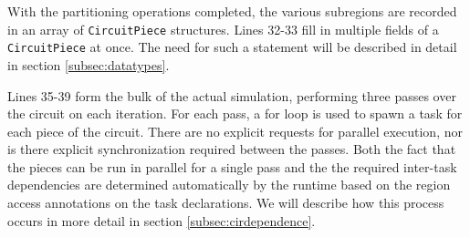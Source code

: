 
With the partitioning operations completed, the various subregions are
recorded in an array of {\tt CircuitPiece} structures.  Lines 32-33 fill in multiple
fields of a {\tt CircuitPiece} at once.  The need for such a statement will be described in detail in 
section \ref{subsec:datatypes}.


Lines 35-39 form the bulk of the actual simulation, performing three passes
over the circuit on each iteration.  For each pass, a for loop is used to 
spawn a task for each piece of the circuit.  There are no explicit requests for
parallel execution, nor is there explicit synchronization required between the
passes.  Both the fact that the pieces can be run in parallel for a single 
pass and the the required inter-task dependencies are determined automatically
by the runtime based on the region access annotations on the task declarations.
We will describe how this process occurs in more detail in section 
\ref{subsec:cirdependence}.

